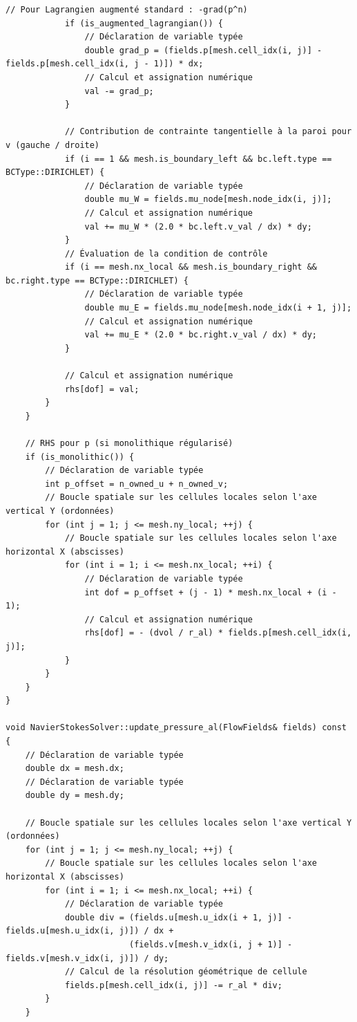 \documentclass[10pt,a4paper,oneside]{book}
\begin{document}
\begin{lstlisting}[language={[11]C++}]
            // Pour Lagrangien augmenté standard : -grad(p^n)
            if (is_augmented_lagrangian()) {
                // Déclaration de variable typée
                double grad_p = (fields.p[mesh.cell_idx(i, j)] - fields.p[mesh.cell_idx(i, j - 1)]) * dx;
                // Calcul et assignation numérique
                val -= grad_p;
            }

            // Contribution de contrainte tangentielle à la paroi pour v (gauche / droite)
            if (i == 1 && mesh.is_boundary_left && bc.left.type == BCType::DIRICHLET) {
                // Déclaration de variable typée
                double mu_W = fields.mu_node[mesh.node_idx(i, j)];
                // Calcul et assignation numérique
                val += mu_W * (2.0 * bc.left.v_val / dx) * dy;
            }
            // Évaluation de la condition de contrôle
            if (i == mesh.nx_local && mesh.is_boundary_right && bc.right.type == BCType::DIRICHLET) {
                // Déclaration de variable typée
                double mu_E = fields.mu_node[mesh.node_idx(i + 1, j)];
                // Calcul et assignation numérique
                val += mu_E * (2.0 * bc.right.v_val / dx) * dy;
            }

            // Calcul et assignation numérique
            rhs[dof] = val;
        }
    }

    // RHS pour p (si monolithique régularisé)
    if (is_monolithic()) {
        // Déclaration de variable typée
        int p_offset = n_owned_u + n_owned_v;
        // Boucle spatiale sur les cellules locales selon l'axe vertical Y (ordonnées)
        for (int j = 1; j <= mesh.ny_local; ++j) {
            // Boucle spatiale sur les cellules locales selon l'axe horizontal X (abscisses)
            for (int i = 1; i <= mesh.nx_local; ++i) {
                // Déclaration de variable typée
                int dof = p_offset + (j - 1) * mesh.nx_local + (i - 1);
                // Calcul et assignation numérique
                rhs[dof] = - (dvol / r_al) * fields.p[mesh.cell_idx(i, j)];
            }
        }
    }
}

void NavierStokesSolver::update_pressure_al(FlowFields& fields) const {
    // Déclaration de variable typée
    double dx = mesh.dx;
    // Déclaration de variable typée
    double dy = mesh.dy;

    // Boucle spatiale sur les cellules locales selon l'axe vertical Y (ordonnées)
    for (int j = 1; j <= mesh.ny_local; ++j) {
        // Boucle spatiale sur les cellules locales selon l'axe horizontal X (abscisses)
        for (int i = 1; i <= mesh.nx_local; ++i) {
            // Déclaration de variable typée
            double div = (fields.u[mesh.u_idx(i + 1, j)] - fields.u[mesh.u_idx(i, j)]) / dx +
                         (fields.v[mesh.v_idx(i, j + 1)] - fields.v[mesh.v_idx(i, j)]) / dy;
            // Calcul de la résolution géométrique de cellule
            fields.p[mesh.cell_idx(i, j)] -= r_al * div;
        }
    }


\end{lstlisting}
\end{document}
